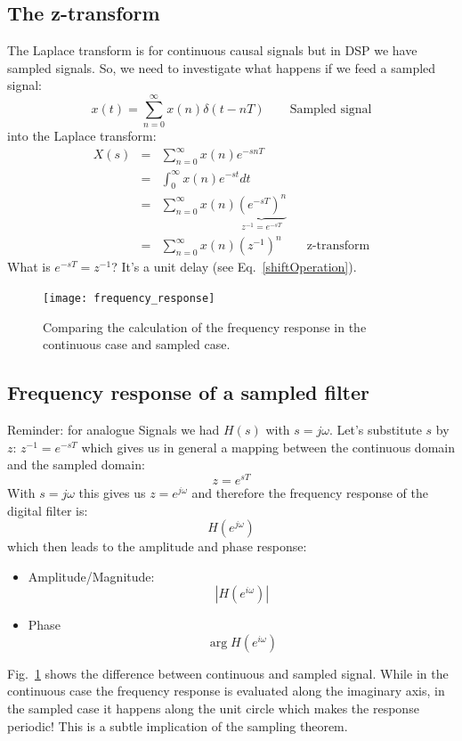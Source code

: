 \documentclass[12pt,a4paper]{article}
\begin{document}
\subsection{The z-transform}
The Laplace transform is for continuous causal signals but in DSP
we have sampled signals. So, we need to investigate what happens
if we feed a sampled signal:
\begin{equation}
x(t) = \sum_{n = 0}^{\infty} x(n) \delta(t - nT) \qquad \mbox{Sampled signal} 
\end{equation} 
into the Laplace transform:
\begin{eqnarray}
X(s) & = & \sum_{n = 0}^{\infty} x(n) e^{-snT} \\
     & = & \int_{0}^{\infty} x(n) e^{-st} dt \\
     & = & \sum_{n = 0}^{\infty} x(n) \underbrace{(e^{-sT})^{n}}_{z^{-1} = e^{-sT}} \\
     & = & \sum_{n = 0}^{\infty} x(n) (z^{-1})^{n} \qquad \mbox{z-transform}
\end{eqnarray}
What is $e^{-sT} = z^{-1}$? It's a unit delay (see Eq.~\ref{shiftOperation}).


\begin{figure}[!hbt]
\begin{center}
\mbox{\texttt{[image: frequency\_response]}}
\end{center}
\caption{Comparing the calculation of the frequency response
in the continuous case and sampled case.
\label{frequency_response}}
\end{figure}


\subsection{Frequency response of a sampled filter}
Reminder: for analogue Signals we had $H(s)$ with $s=j \omega$.
Let's substitute $s$ by $z$: $z^{-1} = e^{-sT}$ which
gives us in general a mapping between the continuous domain and
the sampled domain:
\begin{equation}
z = e^{sT}
\label{mappingsz}
\end{equation}
With $s=j \omega$ this gives us $z = e^{j \omega}$ and therefore
the frequency response of the digital filter is:
\begin{equation}
H(e^{j \omega})
\end{equation}
which then leads to the amplitude and phase response:
\begin{itemize}
\item Amplitude/Magnitude: 
\begin{equation}
|H(e^{i \omega})|
\end{equation}
\item Phase
\begin{equation}
\arg H(e^{i \omega})
\end{equation}
\end{itemize}
Fig.~\ref{frequency_response} shows the difference between
continuous and sampled signal. While in the continuous case
the frequency response
is evaluated along the imaginary axis, in the sampled case
it happens along the unit circle which makes the response
periodic! This is a subtle implication of the sampling theorem.
\end{document}
